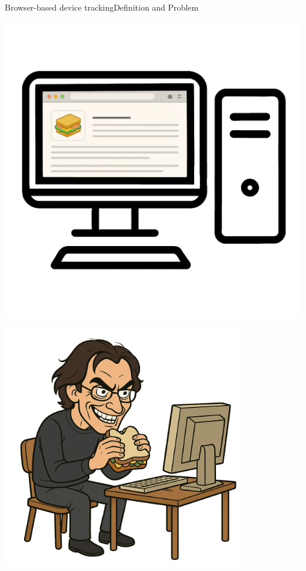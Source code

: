 \documentclass[aspectratio=169, hyperref={colorlinks=true, allcolors=SecondaryColor}, c]{beamer}
\begin{document}
	\begin{frame}[fragile]{Browser-based device tracking}{Definition and Problem}
		\begin{transformation}
			\begin{adjustbox}{scale=1}
				\begin{minipage}{1\textwidth}
					\includegraphics[width=1\textwidth]{./figures/computer_alpha_screen_2_website.png}
				\end{minipage}
			\end{adjustbox}
			\begin{adjustbox}{scale=1}
				\begin{minipage}{1\textwidth}
					\includegraphics[width=0.8\textwidth]{./figures/evil_computer_scientist_alpha.png}

\end{minipage}
\end{adjustbox}
\end{transformation}
\end{frame}
\end{document}
